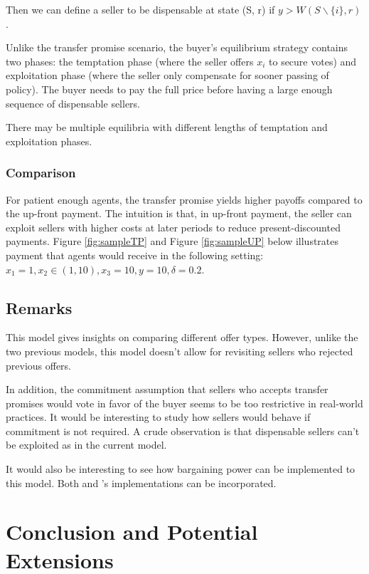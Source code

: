 \documentclass[ProjectGAZ]{subfiles}
\begin{document}
Then we can define a seller to be dispensable at state (S, r) if $y > W(S\backslash \{i\}, r)$.

Unlike the transfer promise scenario, the buyer's equilibrium strategy contains two phases: the temptation phase (where the seller offers $x_i$ to secure votes) and exploitation phase (where the seller only compensate for sooner passing of policy). The buyer needs to pay the full price before having a large enough sequence of dispensable sellers.

There may be multiple equilibria with different lengths of temptation and exploitation phases.

\subsubsection{Comparison}

For patient enough agents, the transfer promise yields higher payoffs compared to the up-front payment. The intuition is that, in up-front payment, the seller can exploit sellers with higher costs at later periods to reduce present-discounted payments. Figure \ref{fig:sampleTP} and Figure \ref{fig:sampleUP} below illustrates payment that agents would receive in the following setting: $x_1 = 1, x_2 \in (1, 10), x_3 = 10, y = 10, \delta = 0.2$.






\subsection{Remarks}

This model gives insights on comparing different offer types. However, unlike the two previous models, this model doesn't allow for revisiting sellers who rejected previous offers.

In addition, the commitment assumption that sellers who accepts transfer promises would vote in favor of the buyer seems to be too restrictive in real-world practices. It would be interesting to study how sellers would behave if commitment is not required. A crude observation is that dispensable sellers can't be exploited as in the current model.

It would also be interesting to see how bargaining power can be implemented to this model. Both \cite{Xiao} and \cite{InOCoHoldUP}'s implementations can be incorporated.

\section{Conclusion and Potential Extensions}
\end{document}
